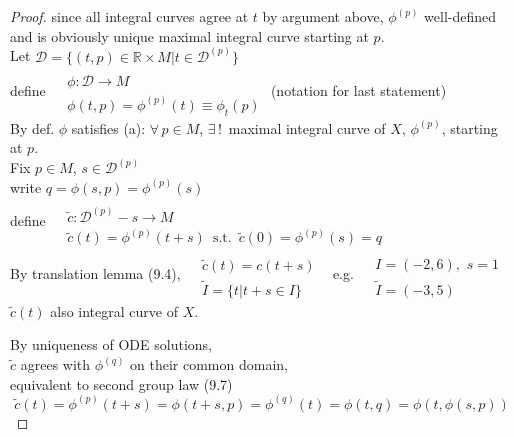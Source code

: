 \documentclass[11pt]{amsart}
\theoremstyle{definition}
\begin{document}
\begin{proof}
since all integral curves agree at $t$ by argument above, $\phi^{(p)}$ well-defined \\
\quad \quad and is obviously unique maximal integral curve starting at $p$.   \\


Let $\mathcal{D} = \lbrace (t,p) \in \mathbb{R} \times M | t \in \mathcal{D}^{(p)} \rbrace$ \\
define $\begin{aligned} & \quad \\
  & \phi :\mathcal{D} \to M \\
  & \phi{(t,p)} = \phi^{(p)}{(t)} \equiv \phi_t{(p)} \end{aligned}$ (notation for last statement)  \\

By def. $\phi$ satisfies (a): $\forall \, p \in M$, $\exists \, ! \, $ maximal integral curve of $X$, $\phi^{(p)}$, starting at $p$.  \\

Fix $p\in M$, $s \in \mathcal{D}^{(p)}$ \\
write $q = \phi{ (s,p) } = \phi^{(p)}(s)$ \\

define $\begin{aligned} & \quad \\
  & \widetilde{c}: \mathcal{D}^{(p)} -s \to M \\
  & \widetilde{c}(t) = \phi^{(p)}(t+s) \, \text{ s.t. } \, \widetilde{c}{(0)} = \phi^{(p)}(s) = q \end{aligned}$ \\

By translation lemma (9.4), $\begin{aligned} & \quad \\
  & \widetilde{c}{(t)} = c{(t+s)} \\
  & \widetilde{I} = \lbrace t | t+s \in I \rbrace \end{aligned}$ \quad \, e.g. $\begin{aligned} & \quad \\
  & I = (-2,6) , \, \, s = 1 \\
  & \widetilde{I} = (-3,5) \end{aligned}$ \quad \, $\widetilde{c}(t)$ also integral curve of $X$.

By uniqueness of ODE solutions, \\
\quad $\widetilde{c}$ agrees with $\phi^{(q)}$ on their common domain, \\
\quad \quad equivalent to second group law (9.7)
\[
\widetilde{c}{(t)} = \phi^{(p)}{ (t+s)} = \phi{(t+s,p)} = \phi^{(q)}{(t)} = \phi{(t,q)} = \phi{(t,\phi{(s,p) }) }
\]



\end{proof}
\end{document}
